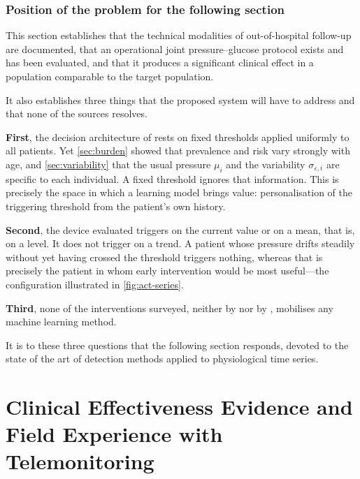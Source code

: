 \documentclass[12pt,a4paper,oneside]{report}
\begin{document}
\subsubsection{Position of the problem for the following section}

This section establishes that the technical modalities of out-of-hospital follow-up are documented, that an operational joint pressure--glucose protocol exists and has been evaluated, and that it produces a significant clinical effect in a population comparable to the target population.

It also establishes three things that the proposed system will have to address and that none of the sources resolves.

\textbf{First}, the decision architecture of \textcite{mihevc2025} rests on fixed thresholds applied uniformly to all patients. Yet \cref{sec:burden} showed that prevalence and risk vary strongly with age, and \cref{sec:variability} that the usual pressure $\mu_i$ and the variability $\sigma_{\varepsilon,i}$ are specific to each individual. A fixed threshold ignores that information. This is precisely the space in which a learning model brings value: personalisation of the triggering threshold from the patient's own history.

\textbf{Second}, the device evaluated triggers on the current value or on a mean, that is, on a level. It does not trigger on a trend. A patient whose pressure drifts steadily without yet having crossed the threshold triggers nothing, whereas that is precisely the patient in whom early intervention would be most useful---the configuration illustrated in \cref{fig:act-series}.

\textbf{Third}, none of the interventions surveyed, neither by \textcite{zhou2024} nor by \textcite{stokes2022}, mobilises any machine learning method.

It is to these three questions that the following section responds, devoted to the state of the art of detection methods applied to physiological time series.

\section{Clinical Effectiveness Evidence and Field Experience with Telemonitoring}\label{sec:evidence}
\end{document}
